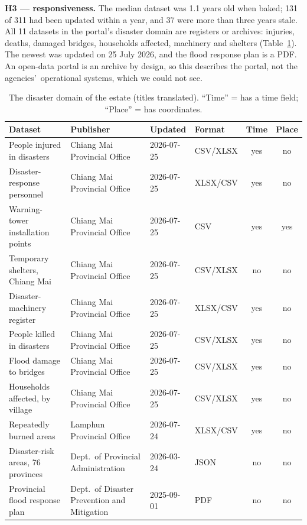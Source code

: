\documentclass[10pt,twocolumn,a4paper]{article}
\begin{document}
\textbf{H3 --- responsiveness.} The median dataset was 1.1 years old when baked; 131 of 311 had been updated within a year, and 37 were more than three years stale. All 11 datasets in the portal\textquoteright s disaster domain are registers or archives: injuries, deaths, damaged bridges, households affected, machinery and shelters (Table~\ref{tab:disaster}). The newest was updated on 25 July 2026, and the flood response plan is a PDF. An open-data portal is an archive by design, so this describes the portal, not the agencies\textquoteright\ operational systems, which we could not see.

\begin{table}[!t]
\centering\small
\caption{The disaster domain of the estate (titles translated). ``Time'' = has a time field; ``Place'' = has coordinates.}\label{tab:disaster}
\begin{tabularx}{\textwidth}{@{}lXllcc@{}}
\toprule
\textbf{Dataset} & \textbf{Publisher} & \textbf{Updated} & \textbf{Format} & \textbf{Time} & \textbf{Place}\\\midrule
People injured in disasters & Chiang Mai Provincial Office & 2026-07-25 & CSV/XLSX & yes & no\\
Disaster-response personnel & Chiang Mai Provincial Office & 2026-07-25 & XLSX/CSV & yes & no\\
Warning-tower installation points & Chiang Mai Provincial Office & 2026-07-25 & CSV & yes & yes\\
Temporary shelters, Chiang Mai & Chiang Mai Provincial Office & 2026-07-25 & CSV/XLSX & no & no\\
Disaster-machinery register & Chiang Mai Provincial Office & 2026-07-25 & XLSX/CSV & yes & no\\
People killed in disasters & Chiang Mai Provincial Office & 2026-07-25 & CSV/XLSX & yes & no\\
Flood damage to bridges & Chiang Mai Provincial Office & 2026-07-25 & CSV/XLSX & yes & no\\
Households affected, by village & Chiang Mai Provincial Office & 2026-07-25 & CSV/XLSX & yes & no\\
Repeatedly burned areas & Lamphun Provincial Office & 2026-07-24 & XLSX/CSV & yes & no\\
Disaster-risk areas, 76 provinces & Dept.\ of Provincial Administration & 2026-03-24 & JSON & no & no\\
Provincial flood response plan & Dept.\ of Disaster Prevention and Mitigation & 2025-09-01 & PDF & no & no\\\bottomrule
\end{tabularx}
\end{table}
\end{document}
